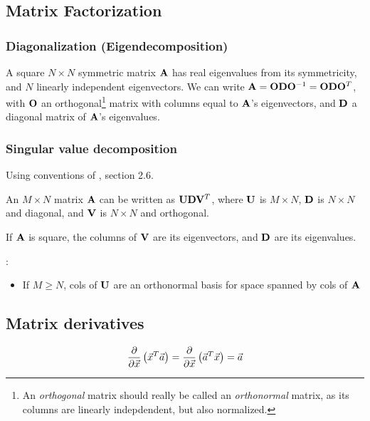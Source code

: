 \documentclass[11pt]{article}
\begin{document}
\begin{appendices}
\subsection{Matrix Factorization}
\subsubsection{Diagonalization (Eigendecomposition)}
\label{subsubsec:matrix}
A square $N \times N$ symmetric matrix $\mathbf{A}$ has real eigenvalues from its symmetricity,
and $N$ linearly independent eigenvectors. We can write
$\mathbf{A} = \mathbf{O} \mathbf{D} \mathbf{O}^{-1} = \mathbf{O} \mathbf{D} \mathbf{O}^T$, with $\mathbf{O}$ an orthogonal\footnote{An
  \emph{orthogonal} matrix should really be called an \emph{orthonormal} matrix, as its
  columns are linearly indepdendent, but also normalized.} matrix with columns equal to
$\mathbf{A}$'s eigenvectors, and $\mathbf{D}$ a diagonal matrix of $\mathbf{A}$'s eigenvalues.


\subsubsection{Singular value decomposition}
\label{subsubsec:SVD}
Using conventions of \cite{PRESS}, section 2.6.

An $M \times N$ matrix $\mathbf{A}$ can be written as $\mathbf{U} \mathbf{D} \mathbf{V}^T$, where $\mathbf{U}$ is
$M \times N$, $\mathbf{D}$ is $N \times N$ and diagonal, and $\mathbf{V}$ is $N \times N$ and
orthogonal.

If $\mathbf{A}$ is square, the columns of $\mathbf{V}$ are its eigenvectors, and $\mathbf{D}$ are its
eigenvalues.

:
\begin{itemize}
  \item If $M \geq N$, cols of $\mathbf{U}$ are an orthonormal basis for space spanned by cols
  of $\mathbf{A}$
\end{itemize}

\TODOFIN{}

\subsection{Matrix derivatives}

\begin{equation}
  \frac{\partial}{\partial \vec{x}} \left( \vec{x}^T \vec{a} \right) =
  \frac{\partial}{\partial \vec{x}} \left( \vec{a}^T \vec{x} \right) =
  \vec{a} 
\end{equation}





\end{appendices}
\end{document}
